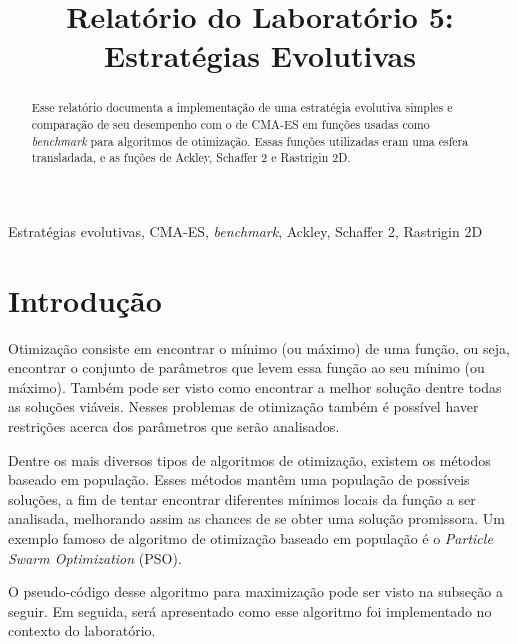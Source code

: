 \documentclass[conference]{IEEEtran}
\begin{document}
\title{Relatório do Laboratório 5: \\ Estratégias Evolutivas\\
}

\author{
}

\maketitle

\begin{abstract}
Esse relatório documenta a implementação de uma estratégia evolutiva simples e comparação de seu desempenho com o de CMA-ES em funções usadas como \textit{benchmark} para algoritmos de otimização. Essas funções utilizadas eram uma esfera transladada, e as fuções de Ackley, Schaffer 2 e Rastrigin 2D.
\end{abstract}

\begin{IEEEkeywords}
Estratégias evolutivas, CMA-ES, \textit{benchmark}, Ackley, Schaffer 2, Rastrigin 2D
\end{IEEEkeywords}

\section{Introdução}
Otimização consiste em encontrar o mínimo (ou máximo) de uma função, ou seja, encontrar o conjunto de parâmetros que levem essa função ao seu mínimo (ou máximo). Também pode ser visto como encontrar a melhor solução dentre todas as soluções viáveis. Nesses problemas de otimização também é possível haver restrições acerca dos parâmetros que serão analisados.

Dentre os mais diversos tipos de algoritmos de otimização, existem os métodos baseado em população. Esses métodos mantêm uma população de possíveis soluções, a fim de tentar encontrar diferentes mínimos locais da função a ser analisada, melhorando assim as chances de se obter uma solução promissora. Um exemplo famoso de algoritmo de otimização baseado em população é o \textit{Particle Swarm Optimization} (PSO).

O pseudo-código desse algoritmo para maximização pode ser visto na subseção a seguir. Em seguida, será apresentado como esse algoritmo foi implementado no contexto do laboratório.
\end{document}
